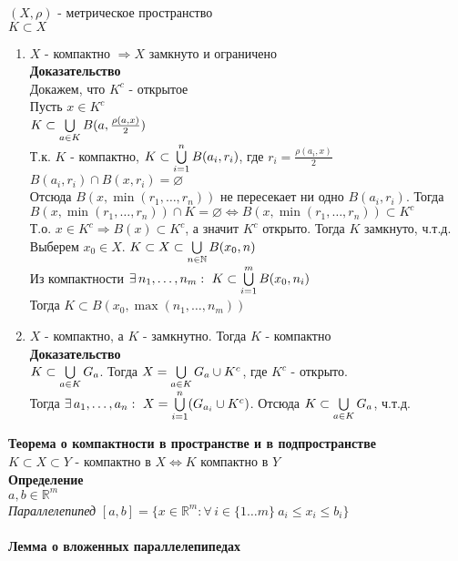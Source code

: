 \documentclass[12pt]{article}
\begin{document}
$(X, \rho)$ - метрическое пространство\\
$K \subset X$
\begin{enumerate}
    \item $X$ - компактно $\Rightarrow X$ замкнуто и ограничено\\
    \textbf{Доказательство}\\
    Докажем, что $K^c$ - открытое\\
    Пусть $x \in K^c$\\
    $K \subset \bigcup\limits_{a\in K} B(a, \frac{\rho(a,x)}2)$\\
    Т.к. $K$ - компактно, $K \subset \bigcup\limits_{i=1}^n B(a_i,r_i)$, где $r_i=\frac{\rho(a_i,x)}2$\\
    $B(a_i,r_i) \cap B(x,r_i) = \varnothing$\\
    Отсюда $B(x, \min(r_1,\ldots,r_n))$ не пересекает ни одно $B(a_i,r_i)$. Тогда $B(x,\min(r_1,\ldots,r_n)) \cap K = \varnothing \Leftrightarrow B(x,\min(r_1,\ldots,r_n)) \subset K^c$\\
    Т.о. $x \in K^c \Rightarrow B(x) \subset K^c$, а значит $K^c$ открыто. Тогда $K$ замкнуто, ч.т.д.
    Выберем $x_0 \in X$. $K \subset X \subset \bigcup\limits_{n\in \mathbb{N}}B(x_0,n)$\\
    Из компактности $\exists\,n_1,\ldots,n_m:\ K \subset \bigcup\limits_{i=1}^m B(x_0, n_i)$\\
    Тогда $K \subset B(x_0,\max(n_1,\ldots,n_m))$
    \item $X$ - компактно, а $K$ - замкнутно. Тогда $K$ - компактно\\
    \textbf{Доказательство}\\
    $K \subset \bigcup\limits_{a\in K} G_a$. Тогда $X = \bigcup\limits_{a\in K} G_a \cup K^c$, где $K^c$ - открыто.\\
    Тогда $\exists\,a_1,\ldots,a_n:\ X = \bigcup\limits_{i=1}^n (G_{a_i} \cup K^c)$. Отсюда $K \subset \bigcup\limits_{a\in K} G_a$, ч.т.д.
\end{enumerate}
\textbf{Теорема о компактности в пространстве и в подпространстве}\\
$K \subset X \subset Y$ - компактно в $X \Leftrightarrow K$ компактно в $Y$\\
\textbf{Определение}\\
$a,b\in \mathbb{R}^m$\\
\textit{Параллелепипед} $[a,b]=\{x\in\mathbb{R}^m: \forall\,i\in\{1\ldots m\}\ a_i\leq x_i\leq b_i\}$\\\\
\textbf{Лемма о вложенных параллелепипедах}\\
\end{document}
